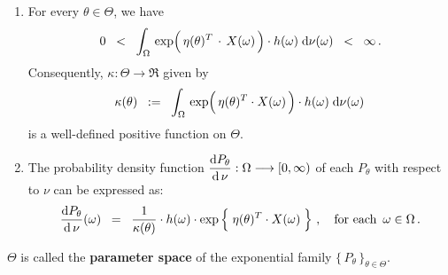 \begin{definition}
\begin{enumerate}
\item
	For every $\theta \in \Theta$, we have
	\begin{equation*}
	0 \;\; < \;\;
		\int_{\Omega}\,
			\exp\!\left(\,\eta(\theta)^{T} \overset{{\color{white}-}}{\cdot} X(\omega)\,\right) \cdot h(\omega)
		\;\d\nu(\omega)
	\;\; < \;\; \infty\,.
	\end{equation*}
	Consequently, $\kappa : \Theta \longrightarrow \Re$ given by
	\begin{equation*}
	\kappa(\theta)
	\;\; := \;\;
		\int_{\Omega}\,
			\exp\!\left(\,\eta(\theta)^{T} \!\overset{{\color{white}-}}{\cdot}\! X(\omega)\,\right) \cdot h(\omega)
		\;\d\nu(\omega)\,
	\end{equation*}
	is a well-defined positive function on $\Theta$.
\item
	The probability density function
	$\dfrac{\textnormal{d} P_{\theta}}{\textnormal{d}\,\nu} : \Omega \longrightarrow [0,\infty)$
	of each $P_{\theta}$ with respect to $\nu$ can be expressed as:
	\begin{equation*}
	\dfrac{\d P_{\theta}}{\d\,\nu}(\omega)
	\;\; = \;\;
		\dfrac{1}{\kappa(\theta)}
		\cdot
		h(\omega)
		\cdot
		\exp\left\{\; \eta(\theta)^{T} \!\overset{{\color{white}-}}{\cdot}\! X(\omega) \;\right\}
		\,,
		\quad
		\textnormal{for each \,$\omega\in\Omega$}\,.
	\end{equation*}
\end{enumerate}
$\Theta$ is called the \textbf{parameter space} of
the exponential family $\{\,P_{\theta}\,\}_{\theta\in\Theta}$.
\end{definition}


